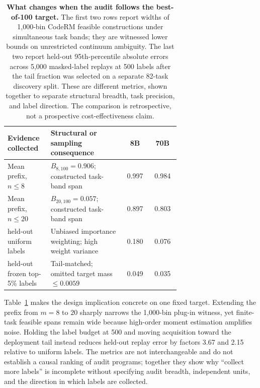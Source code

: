 \documentclass[10pt,twocolumn]{article}
\begin{document}
\begin{table}[t]
\centering
\caption{\textbf{What changes when the audit follows the best-of-100 target.} The first two rows report widths of 1,000-bin CodeRM feasible constructions under simultaneous task bands; they are witnessed lower bounds on unrestricted continuum ambiguity. The last two report held-out 95th-percentile absolute errors across 5,000 masked-label replays at 500 labels after the tail fraction was selected on a separate 82-task discovery split. These are different metrics, shown together to separate structural breadth, task precision, and label direction. The comparison is retrospective, not a prospective cost-effectiveness claim.}
\label{tab:auditdecision}
\begingroup
\scriptsize
\setlength{\tabcolsep}{3pt}
\begin{tabular}{@{}>{\raggedright\arraybackslash}p{0.25\linewidth}>{\raggedright\arraybackslash}p{0.43\linewidth}cc@{}}
\toprule
Evidence collected & Structural or sampling consequence & 8B & 70B \\
\midrule
Mean prefix, $n\le8$ & $B_{8,100}=0.906$; constructed task-band span & 0.997 & 0.984 \\
Mean prefix, $n\le20$ & $B_{20,100}=0.057$; constructed task-band span & 0.897 & 0.803 \\
500 held-out uniform labels & Unbiased importance weighting; high weight variance & 0.180 & 0.076 \\
500 held-out frozen top-5\% labels & Tail-matched; omitted target mass $\le0.0059$ & 0.049 & 0.035 \\
\bottomrule
\end{tabular}
\endgroup
\end{table}

Table~\ref{tab:auditdecision} makes the design implication concrete on one fixed target. Extending the prefix from $m=8$ to $20$ sharply narrows the 1,000-bin plug-in witness, yet finite-task feasible spans remain wide because high-order moment estimation amplifies noise. Holding the label budget at 500 and moving acquisition toward the deployment tail instead reduces held-out replay error by factors 3.67 and 2.15 relative to uniform labels. The metrics are not interchangeable and do not establish a causal ranking of audit programs; together they show why ``collect more labels'' is incomplete without specifying audit breadth, independent units, and the direction in which labels are collected.
\end{document}
